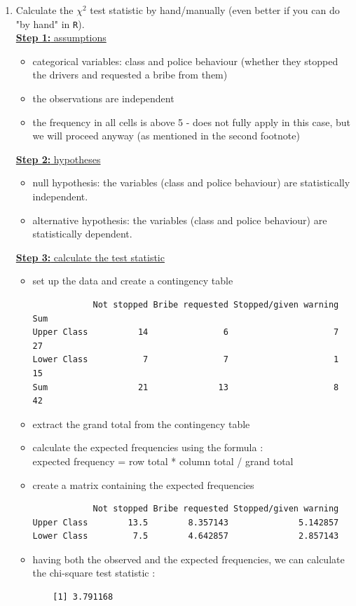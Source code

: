 \documentclass[12pt,letterpaper]{article}
\begin{document}
\begin{enumerate}
	
	\item [(a)]
	Calculate the $\chi^2$ test statistic by hand/manually (even better if you can do "by hand" in \texttt{R}).\\ [0.3cm]
\underline{\textbf{Step 1:} assumptions} 
\begin{itemize}
	\item categorical variables: class and police behaviour (whether they stopped the drivers and requested a bribe from them)
	\item the observations are independent 
	\item the frequency in all cells is above 5 - does not fully apply in this case, but we will proceed anyway (as mentioned in the second footnote)
\end{itemize}
\underline{\textbf{Step 2:} hypotheses} 
\begin{itemize}
	\item null hypothesis: the variables (class and police behaviour) are statistically independent. 
	\item alternative hypothesis: the variables (class and police behaviour) are statistically dependent. 
\end{itemize}
\underline{\textbf{Step 3:} calculate the test statistic} 
\begin{itemize}
	\item set up the data and create a contingency table 

\begin{verbatim}
            Not stopped Bribe requested Stopped/given warning Sum
Upper Class          14               6                     7  27
Lower Class           7               7                     1  15
Sum                  21              13                     8  42
\end{verbatim}
	\item extract the grand total from the contingency table
	\item calculate the expected frequencies using the formula : \\ expected frequency = row total * column total / grand total 

	\item create a matrix containing the expected frequencies 

\begin{verbatim}
            Not stopped Bribe requested Stopped/given warning
Upper Class        13.5        8.357143              5.142857
Lower Class         7.5        4.642857              2.857143
\end{verbatim}
	\item having both the observed and the expected frequencies, we can calculate the chi-square test statistic : 

\begin{verbatim}
	[1] 3.791168
\end{verbatim}
\end{itemize}
	\vspace{0.5cm}
	

\end{enumerate}
\end{document}

